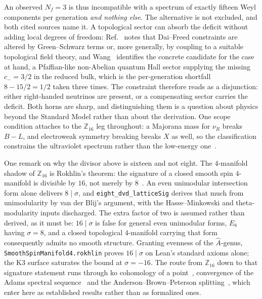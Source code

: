 \documentclass[aps,prl,twocolumn,superscriptaddress,nofootinbib]{revtex4-2}
\begin{document}
An observed $N_f = 3$ is thus incompatible with a spectrum of exactly
fifteen Weyl components per generation \emph{and nothing else}. The
alternative is not excluded, and both cited sources name it. A
topological sector can absorb the deficit without adding local degrees
of freedom: Ref.~\cite{GarciaEtxebarria2019} notes that Dai--Freed
constraints are altered by Green--Schwarz terms or, more generally, by
coupling to a suitable topological field theory, and
Wang~\cite{Wang2024} identifies the concrete candidate for the case at
hand, a Pfaffian-like non-Abelian quantum Hall sector supplying the
missing $c_- = 3/2$ in the reduced bulk, which is the per-generation
shortfall $8 - 15/2 = 1/2$ taken three times. The constraint therefore reads
as a disjunction: either right-handed neutrinos are present, or a
compensating sector carries the deficit. Both horns are sharp, and
distinguishing them is a question about physics beyond the Standard
Model rather than about the derivation. One scope condition attaches to
the $\mathbb{Z}_{16}$ leg throughout: a Majorana mass for $\nu_R$
breaks $B-L$, and electroweak symmetry breaking breaks $X$ as well, so
the classification constrains the ultraviolet spectrum rather than the
low-energy one~\cite[Sec.~4.3]{GarciaEtxebarria2019}.

One remark on why the divisor above is sixteen and not eight. The
$4$-manifold shadow of $\mathbb{Z}_{16}$ is Rokhlin's theorem: the
signature of a closed smooth spin $4$-manifold is divisible by $16$,
not merely by $8$~\cite{Rokhlin1952}. An even unimodular intersection
form alone delivers $8 \mid \sigma$, and \texttt{eight\_dvd\_latticeSig}
derives that much from unimodularity by van der Blij's argument, with
the Hasse--Minkowski and theta-modularity inputs discharged. The extra
factor of two is assumed rather than derived, as it must be:
$16 \mid \sigma$ is false for general even unimodular forms, $E_8$
having $\sigma = 8$, and a closed topological $4$-manifold carrying
that form consequently admits no smooth structure. Granting evenness of
the $\hat{A}$-genus, \texttt{SmoothSpinManifold4.rokhlin} proves
$16 \mid \sigma$ on Lean's standard axioms alone; the K3 surface
saturates the bound at $\sigma = -16$. The route from
$\mathbb{Z}_{16}$ down to that signature statement runs through ko
cohomology of a point~\cite{Adams1974}, convergence of the Adams
spectral sequence~\cite{BeaudryCampbell} and the
Anderson--Brown--Peterson splitting~\cite{ABP1967}, which enter here as
established results rather than as formalized ones.
\end{document}
